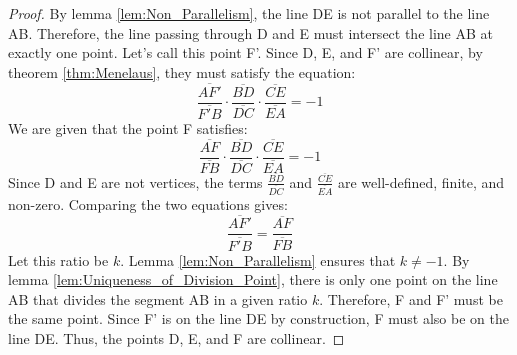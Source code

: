 \begin{proof}
    By lemma \ref{lem:Non_Parallelism}, the line DE is not parallel to the line AB. Therefore, the line passing through D and E must intersect the line AB at exactly one point. Let's call this point F'.
    Since D, E, and F' are collinear, by theorem \ref{thm:Menelaus}, they must satisfy the equation:
    $$ \frac{\overline{AF'}}{\overline{F'B}} \cdot \frac{\overline{BD}}{\overline{DC}} \cdot \frac{\overline{CE}}{\overline{EA}} = -1 $$
    We are given that the point F satisfies:
    $$ \frac{\overline{AF}}{\overline{FB}} \cdot \frac{\overline{BD}}{\overline{DC}} \cdot \frac{\overline{CE}}{\overline{EA}} = -1 $$
    Since D and E are not vertices, the terms $\frac{\overline{BD}}{\overline{DC}}$ and $\frac{\overline{CE}}{\overline{EA}}$ are well-defined, finite, and non-zero. Comparing the two equations gives:
    $$ \frac{\overline{AF'}}{\overline{F'B}} = \frac{\overline{AF}}{\overline{FB}} $$
    Let this ratio be $k$. Lemma \ref{lem:Non_Parallelism} ensures that $k \neq -1$.
    By lemma \ref{lem:Uniqueness_of_Division_Point}, there is only one point on the line AB that divides the segment AB in a given ratio $k$. Therefore, F and F' must be the same point.
    Since F' is on the line DE by construction, F must also be on the line DE. Thus, the points D, E, and F are collinear.
\end{proof} 